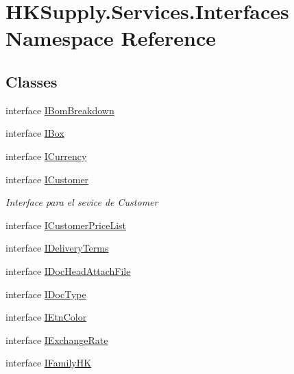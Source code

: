 \hypertarget{namespace_h_k_supply_1_1_services_1_1_interfaces}{}\section{H\+K\+Supply.\+Services.\+Interfaces Namespace Reference}
\label{namespace_h_k_supply_1_1_services_1_1_interfaces}
\subsection*{Classes}
\begin{DoxyCompactItemize}
\item 
interface \mbox{\hyperlink{interface_h_k_supply_1_1_services_1_1_interfaces_1_1_i_bom_breakdown}{I\+Bom\+Breakdown}}
\item 
interface \mbox{\hyperlink{interface_h_k_supply_1_1_services_1_1_interfaces_1_1_i_box}{I\+Box}}
\item 
interface \mbox{\hyperlink{interface_h_k_supply_1_1_services_1_1_interfaces_1_1_i_currency}{I\+Currency}}
\item 
interface \mbox{\hyperlink{interface_h_k_supply_1_1_services_1_1_interfaces_1_1_i_customer}{I\+Customer}}
\begin{DoxyCompactList}\small\item\em Interface para el sevice de Customer \end{DoxyCompactList}\item 
interface \mbox{\hyperlink{interface_h_k_supply_1_1_services_1_1_interfaces_1_1_i_customer_price_list}{I\+Customer\+Price\+List}}
\item 
interface \mbox{\hyperlink{interface_h_k_supply_1_1_services_1_1_interfaces_1_1_i_delivery_terms}{I\+Delivery\+Terms}}
\item 
interface \mbox{\hyperlink{interface_h_k_supply_1_1_services_1_1_interfaces_1_1_i_doc_head_attach_file}{I\+Doc\+Head\+Attach\+File}}
\item 
interface \mbox{\hyperlink{interface_h_k_supply_1_1_services_1_1_interfaces_1_1_i_doc_type}{I\+Doc\+Type}}
\item 
interface \mbox{\hyperlink{interface_h_k_supply_1_1_services_1_1_interfaces_1_1_i_etn_color}{I\+Etn\+Color}}
\item 
interface \mbox{\hyperlink{interface_h_k_supply_1_1_services_1_1_interfaces_1_1_i_exchange_rate}{I\+Exchange\+Rate}}
\item 
interface \mbox{\hyperlink{interface_h_k_supply_1_1_services_1_1_interfaces_1_1_i_family_h_k}{I\+Family\+HK}}

\end{DoxyCompactItemize}
